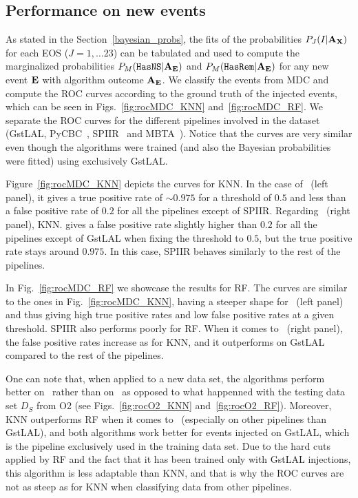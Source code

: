 \subsection{Performance on new events}

As stated in the Section~\ref{bayesian_probs}, the fits of the probabilities
$P_J(I|{\bf A}_{\bf X})$ for each EOS ($J=1,\dots 23$) can be tabulated and
used to compute the marginalized probabilities $P_M({{\tt HasNS}}|{\bf A}_{\bf E})$
and $P_M({{\tt HasRem}}|{\bf A}_{\bf E})$ for any new event $\bf E$ with algorithm
outcome $\bf A_{E}$.  We classify the events from MDC and compute the ROC curves according to the ground truth of
the injected events, which can be seen in Figs.~\ref{fig:rocMDC_KNN}
and~\ref{fig:rocMDC_RF}. We separate the ROC curves for the different pipelines
involved in the dataset (GstLAL,  PyCBC~\cite{Usman:2015kfa},
SPIIR~\cite{Chu:2020pjv} and MBTA~\cite{Adams:2015ulm}). Notice that the curves are very similar even though the algorithms were trained (and also the Bayesian probabilities were fitted) using exclusively GstLAL.

Figure~\ref{fig:rocMDC_KNN} depicts the curves for \ac{KNN}.  In the case of
\hasns\ (left panel), it gives a true positive rate of $\sim 0.975$ for a
threshold of $0.5$ and less than a false positive rate of $0.2$ for all the
pipelines except of SPIIR. Regarding \hasrem\ (right panel), \ac{KNN}. gives a
false positive rate slightly higher than $0.2$ for all the pipelines except of
GstLAL when fixing the threshold to $0.5$, but the true positive rate stays
around $0.975$. In this case, SPIIR behaves similarly to the rest of the pipelines. 

In Fig.~\ref{fig:rocMDC_RF} we showcase the results for \ac{RF}.  The curves
are similar to the ones in Fig.~\ref{fig:rocMDC_KNN}, having a steeper shape for \hasns\ (left panel) and thus giving high true positive rates and low false positive rates at a given threshold. SPIIR also performs poorly for \ac{RF}. When it comes to \hasrem\ (right panel), the false positive rates increase as for \ac{KNN}, and it outperforms on GstLAL compared to the rest of the pipelines.  

One can note that, when applied to a new data set, the algorithms perform better on \hasns\ rather than on \hasrem\, as opposed to what happenned with the testing data set $D_S$ from O2 (see Figs.~\ref{fig:rocO2_KNN} and~\ref{fig:rocO2_RF}). Moreover, \ac{KNN} outperforms \ac{RF} when it comes to \hasrem\ (especially on other pipelines than GstLAL), and both algorithms work better for events injected on GstLAL, which is the pipeline exclusively used in the training data set. Due to the hard cuts applied by \ac{RF} and the fact that it has been trained only with GstLAL injections, this algorithm is less adaptable than \ac{KNN}, and that is why the ROC curves are not as steep as for \ac{KNN} when classifying data from other pipelines. 

